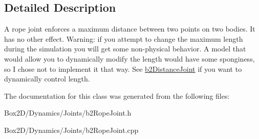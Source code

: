 \subsection{Detailed Description}
A rope joint enforces a maximum distance between two points on two bodies. It has no other effect. Warning\+: if you attempt to change the maximum length during the simulation you will get some non-\/physical behavior. A model that would allow you to dynamically modify the length would have some sponginess, so I chose not to implement it that way. See \hyperlink{classb2_distance_joint}{b2\+Distance\+Joint} if you want to dynamically control length. 

The documentation for this class was generated from the following files\+:\begin{DoxyCompactItemize}
\item 
Box2\+D/\+Dynamics/\+Joints/b2\+Rope\+Joint.\+h\item 
Box2\+D/\+Dynamics/\+Joints/b2\+Rope\+Joint.\+cpp\end{DoxyCompactItemize}
